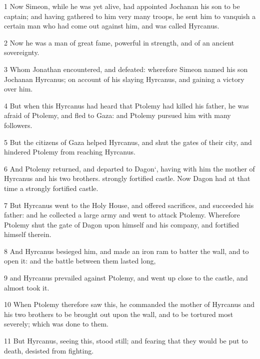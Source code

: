 \par 1 Now Simeon, while he was yet alive, had appointed Jochanan his son to be captain; and having gathered to him very many troops, he sent him to vanquish a certain man who had come out against him, and was called Hyrcanus. 

\par 2 Now he was a man of great fame, powerful in strength, and of an ancient sovereignty. 

\par 3 Whom Jonathan encountered, and defeated: wherefore Simeon named his son Jochanan Hyrcanus; on account of his slaying Hyrcanus, and gaining a victory over him. 

\par 4 But when this Hyrcanus had heard that Ptolemy had killed his father, he was afraid of Ptolemy, and fled to Gaza: and Ptolemy pursued him with many followers. 

\par 5 But the citizens of Gaza helped Hyrcanus, and shut the gates of their city, and hindered Ptolemy from reaching Hyrcanus. 

\par 6 And Ptolemy returned, and departed to Dagon‘, having with him the mother of Hyrcanus and his two brothers. strongly fortified castle. Now Dagon had at that time a strongly fortified castle.

\par 7 But Hyrcanus went to the Holy House, and offered sacrifices, and succeeded his father: and he collected a large army and went to attack Ptolemy. Wherefore Ptolemy shut the gate of Dagon upon himself and his company, and fortified himself therein. 

\par 8 And Hyrcanus besieged him, and made an iron ram to batter the wall, and to open it: and the battle between them lasted long, 

\par 9 and Hyrcanus prevailed against Ptolemy, and went up close to the castle, and almost took it. 

\par 10 When Ptolemy therefore saw this, he commanded the mother of Hyrcanus and his two brothers to be brought out upon the wall, and to be tortured most severely; which was done to them. 

\par 11 But Hyrcanus, seeing this, stood still; and fearing that they would be put to death, desisted from fighting. 

